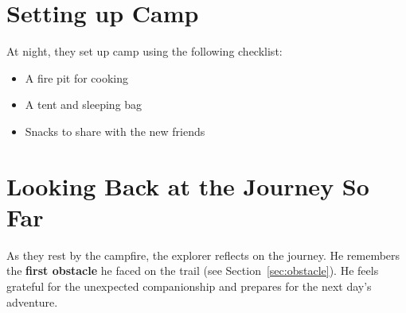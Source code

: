 \documentclass{book}
\begin{document}
\section{Setting up Camp}
\label{sec:camp}
At night, they set up camp using the following checklist:
\begin{itemize}
    \item A fire pit for cooking
    \item A tent and sleeping bag
    \item Snacks to share with the new friends
\end{itemize}

\section{Looking Back at the Journey So Far}
\label{sec:recap}
As they rest by the campfire, the explorer reflects on the journey. He remembers the \textbf{first obstacle} he faced on the trail (see Section~\ref{sec:obstacle}). He feels grateful for the unexpected companionship and prepares for the next day's adventure.
\end{document}
